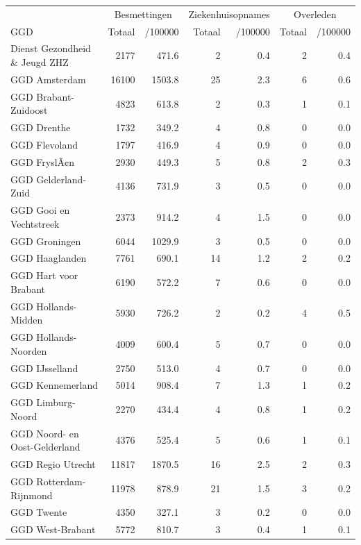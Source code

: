 \documentclass[
  english,
  man,floatsintext]{apa6}
\begin{document}
\begin{table}
\centering\begingroup\fontsize{10}{12}\selectfont

\begin{threeparttable}
\begin{tabular}{lrrrrrr}
\toprule
\multicolumn{1}{c}{ } & \multicolumn{2}{c}{Besmettingen} & \multicolumn{2}{c}{Ziekenhuisopnames} & \multicolumn{2}{c}{Overleden} \\
\cmidrule(l{3pt}r{3pt}){2-3} \cmidrule(l{3pt}r{3pt}){4-5} \cmidrule(l{3pt}r{3pt}){6-7}
GGD & Totaal & /100000 & Totaal & /100000 & Totaal & /100000\\
\midrule
Dienst Gezondheid \& Jeugd ZHZ & 2177 & 471.6 & 2 & 0.4 & 2 & 0.4\\
GGD Amsterdam & 16100 & 1503.8 & 25 & 2.3 & 6 & 0.6\\
GGD Brabant-Zuidoost & 4823 & 613.8 & 2 & 0.3 & 1 & 0.1\\
GGD Drenthe & 1732 & 349.2 & 4 & 0.8 & 0 & 0.0\\
GGD Flevoland & 1797 & 416.9 & 4 & 0.9 & 0 & 0.0\\
GGD FryslÃ¢n & 2930 & 449.3 & 5 & 0.8 & 2 & 0.3\\
GGD Gelderland-Zuid & 4136 & 731.9 & 3 & 0.5 & 0 & 0.0\\
GGD Gooi en Vechtstreek & 2373 & 914.2 & 4 & 1.5 & 0 & 0.0\\
GGD Groningen & 6044 & 1029.9 & 3 & 0.5 & 0 & 0.0\\
GGD Haaglanden & 7761 & 690.1 & 14 & 1.2 & 2 & 0.2\\
GGD Hart voor Brabant & 6190 & 572.2 & 7 & 0.6 & 0 & 0.0\\
GGD Hollands-Midden & 5930 & 726.2 & 2 & 0.2 & 4 & 0.5\\
GGD Hollands-Noorden & 4009 & 600.4 & 5 & 0.7 & 0 & 0.0\\
GGD IJsselland & 2750 & 513.0 & 4 & 0.7 & 0 & 0.0\\
GGD Kennemerland & 5014 & 908.4 & 7 & 1.3 & 1 & 0.2\\
GGD Limburg-Noord & 2270 & 434.4 & 4 & 0.8 & 1 & 0.2\\
GGD Noord- en Oost-Gelderland & 4376 & 525.4 & 5 & 0.6 & 1 & 0.1\\
GGD Regio Utrecht & 11817 & 1870.5 & 16 & 2.5 & 2 & 0.3\\
GGD Rotterdam-Rijnmond & 11978 & 878.9 & 21 & 1.5 & 3 & 0.2\\
GGD Twente & 4350 & 327.1 & 3 & 0.2 & 0 & 0.0\\
GGD West-Brabant & 5772 & 810.7 & 3 & 0.4 & 1 & 0.1\\

\end{tabular}
\end{threeparttable}
\end{table}
\end{document}
